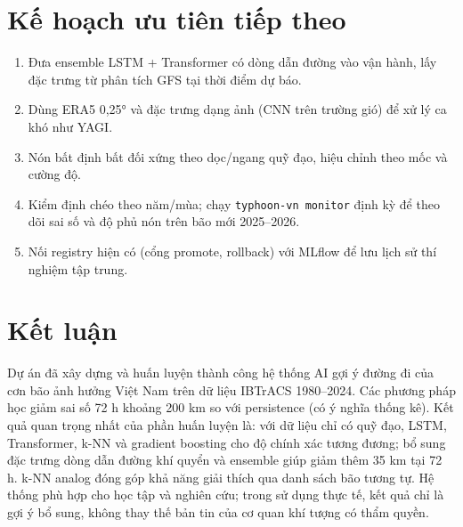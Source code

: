 \documentclass[12pt,a4paper]{article}
\begin{document}
\section{Kế hoạch ưu tiên tiếp theo}
\begin{enumerate}
  \item Đưa ensemble LSTM + Transformer có dòng dẫn đường vào vận hành, lấy đặc trưng
        từ phân tích GFS tại thời điểm dự báo.
  \item Dùng ERA5 0,25° và đặc trưng dạng ảnh (CNN trên trường gió) để xử lý ca khó
        như YAGI.
  \item Nón bất định bất đối xứng theo dọc/ngang quỹ đạo, hiệu chỉnh theo mốc và cường độ.
  \item Kiểm định chéo theo năm/mùa; chạy \texttt{typhoon-vn monitor} định kỳ để theo
        dõi sai số và độ phủ nón trên bão mới 2025--2026.
  \item Nối registry hiện có (cổng promote, rollback) với MLflow để lưu lịch sử thí
        nghiệm tập trung.
\end{enumerate}

\section{Kết luận}
Dự án đã xây dựng và huấn luyện thành công hệ thống AI gợi ý đường đi của cơn bão
ảnh hưởng Việt Nam trên dữ liệu IBTrACS 1980--2024. Các phương pháp học giảm sai số
72 h khoảng 200 km so với persistence (có ý nghĩa thống kê). Kết quả quan trọng nhất
của phần huấn luyện là: với dữ liệu chỉ có quỹ đạo, LSTM, Transformer, k-NN và
gradient boosting cho độ chính xác tương đương; bổ sung đặc trưng dòng dẫn đường khí
quyển và ensemble giúp giảm thêm 35 km tại 72 h. k-NN analog đóng góp khả năng giải
thích qua danh sách bão tương tự. Hệ thống phù hợp cho học tập và nghiên cứu; trong
sử dụng thực tế, kết quả chỉ là gợi ý bổ sung, không thay thế bản tin của cơ quan
khí tượng có thẩm quyền.
\end{document}
